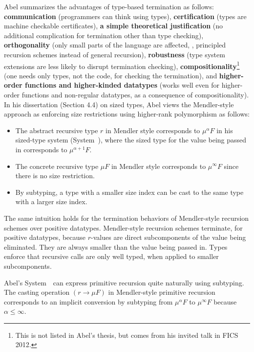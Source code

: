 Abel \cite{abel06phd,Abel12talkFICS} summarizes the advantages of
type-based termination as follows:
\textbf{communication} (programmers can think using types),
\textbf{certification} (types are machine checkable certificates),
\textbf{a simple theoretical justification}
        (no additional complication for termination other than type checking),
\textbf{orthogonality} (only small parts of the language are affected,
        \eg, principled recursion schemes instead of general recursion),
\textbf{robustness} (type system extensions are less likely to
                        disrupt termination checking),
\textbf{compositionality}\footnote{This is not listed in Abel's thesis,
                                but comes from his invited talk in FICS 2012.}
        (one needs only types, not the code, for checking the termination), and
\textbf{higher-order functions and higher-kinded datatypes}
        (works well even for higher-order functions and non-regular datatypes,
        as a consequence of compositionality).
In his dissertation \cite{abel06phd} (Section 4.4) on sized types,
Abel views the Mendler-style approach as enforcing size restrictions
using higher-rank polymorphism as follows:
\begin{itemize}
\item The abstract recursive type $r$ in Mendler style corresponds to
        $\mu^\alpha F$ in his sized-type system (System~\Fwhat),
        where the sized type
        for the value being passed in corresponds to $\mu^{\alpha+1} F$.
\item The concrete recursive type $\mu F$ in Mendler style corresponds to
        $\mu^\infty F$ since there is no size restriction.
\item By subtyping, a type with a smaller size index can be cast to
        the same type with a larger size index.
\end{itemize}
The same intuition holds for the termination behaviors
of Mendler-style recursion schemes over positive datatypes.
Mendler-style recursion schemes terminate, for positive datatypes,
because $r$-values are direct subcomponents of the value being eliminated.
They are always smaller than the value being passed in.
Types enforce that recursive calls are only well typed,
when applied to smaller subcomponents.

Abel's System~\Fwhat\ can express primitive recursion quite naturally
using subtyping. The casting operation $(r \to \mu F)$ in Mendler-style
primitive recursion corresponds to an implicit conversion by subtyping
from $\mu^\alpha F$ to $\mu^\infty F$ because $\alpha \leq \infty$.

